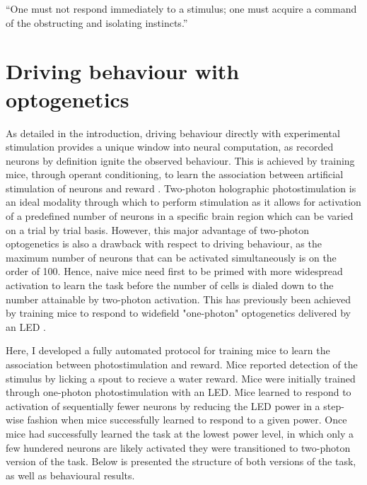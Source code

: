 \begin{savequote}[8cm]
“One must not respond immediately to a stimulus; one must acquire a command of the obstructing and isolating instincts.”
\end{savequote}

\chapter{\label{behaviour} Driving behaviour with optogenetics}

\minitoc



As detailed in the introduction, driving behaviour directly with experimental stimulation provides a unique window into neural computation, as recorded neurons by definition ignite the observed behaviour. This is achieved by training mice, through operant conditioning, to learn the association between artificial stimulation of neurons and reward \cite{huber_sparse_2008, houweling_behavioural_2008, histed_cortical_2014, dalgleish_how_2020, gill_precise_2020}. Two-photon holographic photostimulation is an ideal modality through which to perform stimulation as it allows for activation of a predefined number of neurons in a specific brain region which can be varied on a trial by trial basis. However, this major advantage of two-photon optogenetics is also a drawback with respect to driving behaviour, as the maximum number of neurons that can be activated simultaneously is on the order of 100. Hence, naive mice need first to be primed with more widespread activation to learn the task before the number of cells is dialed down to the number attainable by two-photon activation. This has previously been achieved by training mice to respond to widefield "one-photon" optogenetics delivered by an LED \cite{dalgleish_how_2020, gill_precise_2020}.

Here, I developed a fully automated protocol for training mice to learn the association between photostimulation and reward. Mice reported detection of the stimulus by licking a spout to recieve a water reward. Mice were initially trained through one-photon photostimulation with an LED. Mice learned to respond to activation of sequentially fewer neurons by reducing the LED power in a step-wise fashion when mice successfully learned to respond to a given power. Once mice had successfully learned the task at the lowest power level, in which only a few hundered neurons are likely activated \cite{huber_sparse_2008} they were transitioned to two-photon version of the task. Below is presented the structure of both versions of the task, as well as behavioural results. 

